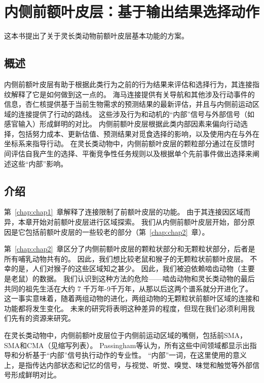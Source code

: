 \chapter{内侧前额叶皮层：基于输出结果选择动作} \label{chap:chap3}

这本书提出了关于灵长类动物前额叶皮层基本功能的方案。



\section{概述}
内侧前额叶皮层有助于根据此类行为之前的行为结果来评估和选择行为，其连接指纹解释了它是如何做到这一点的。
海马连接提供有关导航和其他涉及行动事件的信息，杏仁核提供基于当前生物需求的预测结果的最新评估，并且与内侧前运动区域的连接提供了行动的路线。
这些涉及行为和动机的“内部”信号与外部信号（如感官输入）形成鲜明的对比。
内侧前额叶皮层根据此类内部因素来偏向行动选择，包括努力成本、更新估值、预测结果对觅食选择的影响，以及使用内在与外在坐标系来指导行动。
在灵长类动物中，内侧前额叶皮层的颗粒部分通过在反馈时间评估自我产生的选择、平衡竞争性任务规则以及根据单个先前事件做出选择来阐述这些“内部”影响。\par



\section{介绍}

第~\ref{chap:chap1}~章解释了连接限制了前额叶皮层的功能。
由于其连接因区域而异，本章开始对前额叶皮层进行区域探索。
我们从内侧前额叶皮层开始，部分原因是它包括前额叶皮层的一些较老的部分（第~\ref{chap:chap2}~章）。\par


第~\ref{chap:chap2}~章区分了内侧前额叶皮层的颗粒状部分和无颗粒状部分，后者是所有哺乳动物共有的。
因此，我们想比较老鼠和猴子的无颗粒状前额叶皮层。
不幸的是，人们对猴子的这些区域知之甚少。
因此，我们被迫依赖啮齿动物（主要是老鼠）的数据。
我们认识到这种方法的危险——啮齿动物和灵长类动物的最后共同的祖先生活在大约 7 千万年-9千万年，从那以后这两个谱系就分开进化了。
这一事实意味着，随着两组动物的进化，两组动物的无颗粒状前额叶区域的连接和功能都将发生变化。
未来的研究将表明这种差异的程度，但现在我们必须利用我们先有的资源来研究。\par


在灵长类动物中，内侧前额叶皮层位于内侧前运动区域的嘴侧，包括前SMA，SMA和CMA（见缩写列表）。
Passingham等\cite{passingham2010medial}认为，所有这些中间领域都显示出指导和分析基于“内部”信号执行动作的专业性。
“内部”一词，在这里使用的意义上，是指传达内部状态和记忆的信号，与视觉、听觉、嗅觉、味觉和触觉等外部信号形成鲜明对比。



